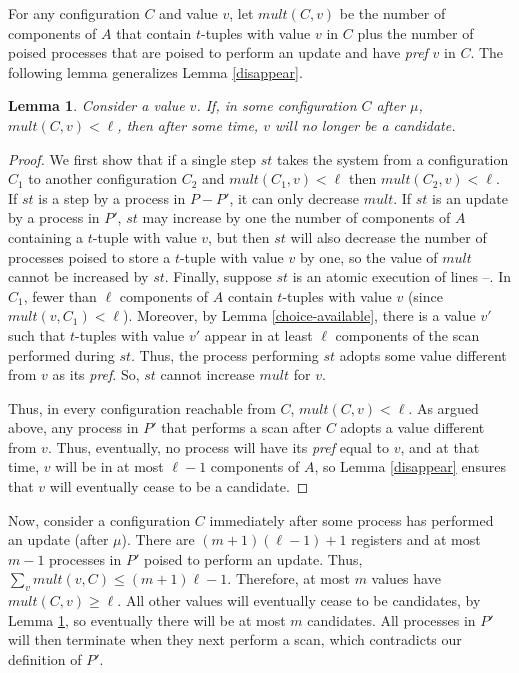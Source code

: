 \documentclass[11pt]{article}
\newtheorem{lemma}[theorem]{Lemma}
\newcounter{linenum}
\newcounter{ind}
\newcommand{\lref}[1]{\linenumref{#1}}
\begin{document}
For any configuration $C$ and value $v$, let $mult(C,v)$ be the number of components of $A$ that contain $t$-tuples with value $v$ in $C$ plus the number of poised processes that are poised to perform an update and have {\it pref} $v$ in $C$.
The following lemma generalizes Lemma \ref{disappear}.

\begin{lemma}
\label{disappear2}
Consider a value $v$.  If, in some configuration $C$ after $\mu$, $mult(C,v) < \ell$, then after some time, $v$ will no longer be a candidate.
\end{lemma}
\begin{proof}
We first show that if a single step $st$ takes the system from a configuration $C_1$ to another configuration $C_2$ and $mult(C_1,v)<\ell$ then $mult(C_2,v)<\ell$.
If $st$ is a step by a process in $P-P'$, it can only decrease $mult$.
If $st$ is an update by a process in $P'$, 
$st$ may increase by one the number of components of $A$ containing a $t$-tuple with
value $v$, but then $st$ will also decrease the number of processes poised
to store a $t$-tuple with value $v$ by one, so the value of $mult$ cannot
be increased by $st$.
Finally, suppose $st$ is an atomic execution of lines \lref{snap-anon}--\lref{change-index-anon}.
In $C_1$, fewer than $\ell$ components of $A$ contain $t$-tuples with value
$v$ (since $mult(v,C_1)<\ell$).  Moreover, by Lemma \ref{choice-available}, there
is a value $v'$ such that $t$-tuples with value $v'$ appear in at least $\ell$
components of the scan performed during $st$.  Thus,
the process performing $st$ adopts some value different from $v$ as its {\it pref}.
So, $st$ cannot increase $mult$ for $v$.

Thus, in every configuration reachable from $C$, $mult(C,v)<\ell$.
As argued above, any process in $P'$ that performs a scan after $C$ adopts
a value different from $v$.
Thus, eventually, no process will have its {\it pref} equal to $v$, and at that time, $v$ will be in at most $\ell-1$ components of $A$, so Lemma \ref{disappear} ensures that $v$ will eventually cease to be a candidate.
\end{proof}

Now, consider a configuration $C$ immediately after some process has performed an
update (after $\mu$).
There are $(m+1)(\ell-1)+1$ registers and at most $m-1$ processes in $P'$ poised
to perform an update.  Thus, $\sum\limits_v mult(v,C) \leq (m+1)\ell-1$.  Therefore, at most $m$ values have $mult(C,v) \geq \ell$.  All other values will eventually cease to be candidates, by Lemma \ref{disappear2}, so eventually there will be at most $m$ candidates.  All processes in $P'$ will then terminate when they next perform a scan, which contradicts our definition of $P'$.
\end{document}
